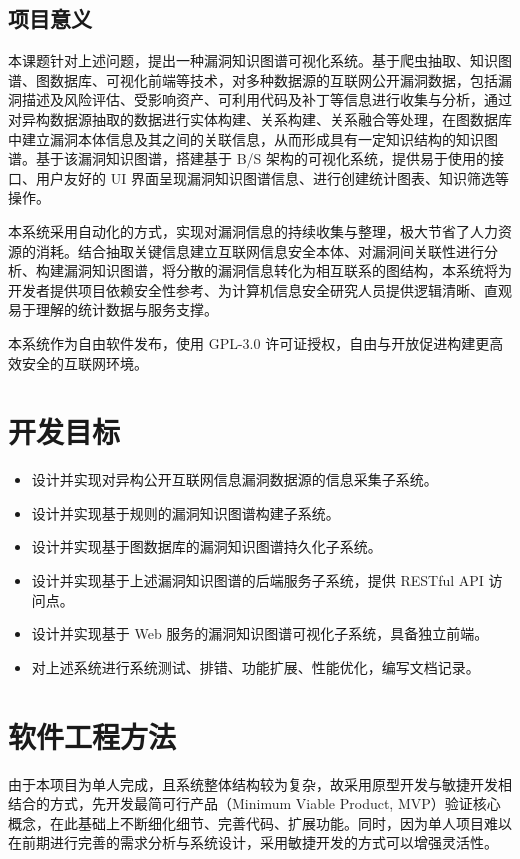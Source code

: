 \documentclass[a4paper,AutoFakeBold,oneside,12pt]{book}
\begin{document}
\subsection{项目意义}

本课题针对上述问题，提出一种漏洞知识图谱可视化系统。基于爬虫抽取、知识图谱、图数据库、可视化前端等技术，对多种数据源的互联网公开漏洞数据，包括漏洞描述及风险评估、受影响资产、可利用代码及补丁等信息进行收集与分析，通过对异构数据源抽取的数据进行实体构建、关系构建、关系融合等处理，在图数据库中建立漏洞本体信息及其之间的关联信息，从而形成具有一定知识结构的知识图谱。基于该漏洞知识图谱，搭建基于 B/S 架构的可视化系统，提供易于使用的接口、用户友好的 UI 界面呈现漏洞知识图谱信息、进行创建统计图表、知识筛选等操作。

本系统采用自动化的方式，实现对漏洞信息的持续收集与整理，极大节省了人力资源的消耗。结合抽取关键信息建立互联网信息安全本体、对漏洞间关联性进行分析、构建漏洞知识图谱，将分散的漏洞信息转化为相互联系的图结构，本系统将为开发者提供项目依赖安全性参考、为计算机信息安全研究人员提供逻辑清晰、直观易于理解的统计数据与服务支撑。

本系统作为自由软件\cite{libre_software}发布，使用 GPL-3.0\cite{gpl_v3} 许可证授权，自由与开放促进构建更高效安全的互联网环境。

\section{开发目标}

\begin{itemize}
	\item 设计并实现对异构公开互联网信息漏洞数据源的信息采集子系统。
	\item 设计并实现基于规则的漏洞知识图谱构建子系统。
	\item 设计并实现基于图数据库的漏洞知识图谱持久化子系统。
	\item 设计并实现基于上述漏洞知识图谱的后端服务子系统，提供 RESTful API 访问点。
	\item 设计并实现基于 Web 服务的漏洞知识图谱可视化子系统，具备独立前端。
	\item 对上述系统进行系统测试、排错、功能扩展、性能优化，编写文档记录。
\end{itemize}

\section{软件工程方法}

由于本项目为单人完成，且系统整体结构较为复杂，故采用原型开发与敏捷开发\cite{manifesto_agile_dev}相结合的方式，先开发最简可行产品\cite{minimum_viable_product}（Minimum Viable Product, MVP）验证核心概念，在此基础上不断细化细节、完善代码、扩展功能。同时，因为单人项目难以在前期进行完善的需求分析与系统设计，采用敏捷开发的方式可以增强灵活性。
\end{document}
